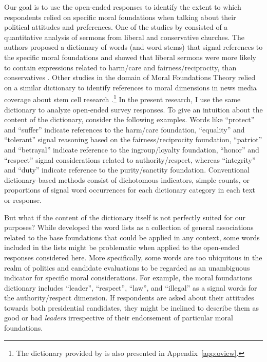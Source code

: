 \documentclass[12pt]{article}
\begin{document}
Our goal is to use the open-ended responses to identify the extent to which respondents relied on specific moral foundations when talking about their political attitudes and preferences. One of the studies by \citet{graham2009liberals} consisted of a quantitative analysis of sermons from liberal and conservative churches. The authors proposed a dictionary of words (and word stems) that signal references to the specific moral foundations and showed that liberal sermons were more likely to contain expressions related to harm/care and fairness/reciprocity, than conservatives \citep[see also][for multi-dimensional conceptualizations of ideology]{haidt2009above}. Other studies in the domain of Moral Foundations Theory relied on a similar dictionary to identify references to moral dimensions in news media coverage about stem cell research \citep{clifford2013words}.\footnote{The dictionary provided by \citet{graham2009liberals} is also presented in Appendix~\ref{app:oview}.} In the present research, I use the same dictionary to analyze open-ended survey responses. To give an intuition about the content of the dictionary, consider the following examples. Words like ``protect'' and ``suffer'' indicate references to the harm/care foundation, ``equality'' and ``tolerant'' signal reasoning based on the fairness/reciprocity foundation, ``patriot'' and ``betrayal'' indicate reference to the ingroup/loyalty foundation, ``honor'' and ``respect'' signal considerations related to authority/respect, whereas ``integrity'' and ``duty'' indicate reference to the purity/sanctity foundation. Conventional dictionary-based methods consist of dichotomous indicators, simple counts, or proportions of signal word occurrences for each dictionary category in each text or response.

But what if the content of the dictionary itself is not perfectly suited for our purposes? While \citet{graham2009liberals} developed the word lists as a collection of general associations related to the base foundations that could be applied in any context, some words included in the lists might be problematic when applied to the open-ended responses considered here. More specifically, some words are too ubiquitous in the realm of politics and candidate evaluations to be regarded as an unambiguous indicator for specific moral considerations. For example, the moral foundations dictionary includes ``leader'', ``respect'', ``law'', and ``illegal'' as a signal words for the authority/respect dimension. If respondents are asked about their attitudes towards both presidential candidates, they might be inclined to describe them as good or bad \textit{leaders} irrespective of their endorsement of particular moral foundations.
\end{document}
